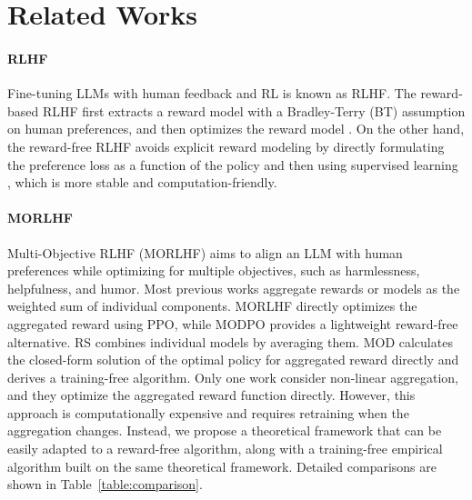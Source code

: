 \section{Related Works}

\paragraph{RLHF}
Fine-tuning LLMs with human feedback and RL is known as RLHF. The reward-based RLHF first extracts a reward model with a Bradley-Terry (BT) assumption on human preferences, and then optimizes the reward model \citep{ouyang2022training,bai2022training,touvron2023llama,azar2024general}. On the other hand, the reward-free RLHF avoids explicit reward modeling by directly formulating the preference loss as a function of the policy and then using supervised learning \citep{wang2023beyond,rafailov2024direct}, which is more stable and computation-friendly. 
\paragraph{MORLHF}
Multi-Objective RLHF (MORLHF) aims to align an LLM with human preferences while optimizing for multiple objectives, such as harmlessness, helpfulness, and humor. Most previous works aggregate rewards or models as the weighted sum of individual components. MORLHF \citep{wu2023fine,bai2022training} directly optimizes the aggregated reward using PPO, while MODPO \citep{zhou2023beyond} provides a lightweight reward-free alternative. RS \citep{rame2024rewarded} combines individual models by averaging them. MOD \citep{shi2024decoding} calculates the closed-form solution of the optimal policy for aggregated reward directly and derives a training-free algorithm. Only one work \citep{zhong2024provable} consider non-linear aggregation, and they optimize the aggregated reward function directly. However, this approach is computationally expensive and requires retraining when the aggregation changes. Instead, we propose a theoretical framework that can be easily adapted to a reward-free algorithm,  along with a training-free empirical algorithm built on the same theoretical framework. Detailed comparisons are shown in Table~\ref{table:comparison}.

